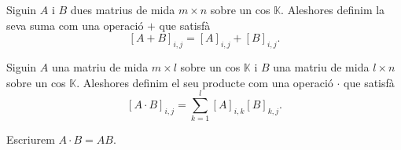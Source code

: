 \documentclass[../Apunts.tex]{subfiles}
\begin{document}
	\begin{definition}
		\label{def:suma de matrius}
		Siguin \(A\) i \(B\) dues matrius de mida \(m\times n\) sobre un cos \(\mathbb{K}\). Aleshores definim la seva suma com una operació \(+\) que satisfà
		\[[A+B]_{i,j}=[A]_{i,j}+[B]_{i,j}.\]
	\end{definition}
	\begin{definition}
		\label{def:producte de matrius}
		Siguin \(A\) una matriu de mida \(m\times l\) sobre un cos \(\mathbb{K}\) i \(B\) una matriu de mida \(l\times n\) sobre un cos \(\mathbb{K}\). Aleshores definim el seu producte com una operació \(\cdot\) que satisfà
		\[[A\cdot B]_{i,j}=\sum_{k=1}^{l}[A]_{i,k}[B]_{k,j}.\]
		
		Escriurem \(A\cdot B=AB\).
	\end{definition}
\end{document}
